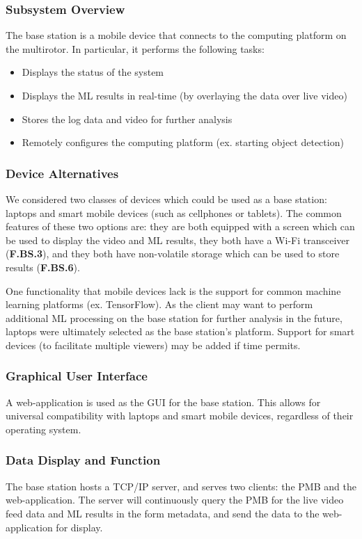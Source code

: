 \subsubsection{Subsystem Overview}

The base station is a mobile device that connects to the computing platform on the multirotor. In particular, it performs the following tasks:
\begin{itemize}
    \item Displays the status of the system
    \item Displays the ML results in real-time (by overlaying the data over live video)
    \item Stores the log data and video for further analysis
    \item Remotely configures the computing platform (ex. starting object detection)
\end{itemize}

\subsubsection{Device Alternatives}
We considered two classes of devices which could be used as a base station: laptops and smart mobile devices (such as cellphones or tablets). The common features of these two options are: they are both equipped with a screen which can be used to display the video and ML results, they both have a Wi-Fi transceiver (\textbf{F.BS.3}), and they both have non-volatile storage which can be used to store results (\textbf{F.BS.6}).

One functionality that mobile devices lack is the support for common machine learning platforms (ex. TensorFlow). As the client may want to perform additional ML processing on the base station for further analysis in the future, laptops were ultimately selected as the base station's platform. Support for smart devices (to facilitate multiple viewers) may be added if time permits.

\subsubsection {Graphical User Interface}
A web-application is used as the GUI for the base station. This allows for universal compatibility with laptops and smart mobile devices, regardless of their operating system.

\subsubsection{Data Display and Function}
The base station hosts a TCP/IP server, and serves two clients: the PMB and the web-application. The server will continuously query the PMB for the live video feed data and ML results in the form metadata, and send the data to the web-application for display.

